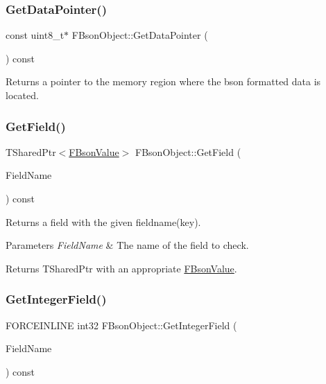 \subsubsection{\texorpdfstring{Get\+Data\+Pointer()}{GetDataPointer()}}
{\footnotesize\ttfamily const uint8\+\_\+t$\ast$ F\+Bson\+Object\+::\+Get\+Data\+Pointer (\begin{DoxyParamCaption}{ }\end{DoxyParamCaption}) const}

\begin{DoxyReturn}{Returns}
a pointer to the memory region where the bson formatted data is located. 
\end{DoxyReturn}
\mbox{\label{class_f_bson_object_a8f5c19b16e114fb51789313da65ee438}} 
\subsubsection{\texorpdfstring{Get\+Field()}{GetField()}}
{\footnotesize\ttfamily T\+Shared\+Ptr$<$\mbox{\hyperlink{class_f_bson_value}{F\+Bson\+Value}}$>$ F\+Bson\+Object\+::\+Get\+Field (\begin{DoxyParamCaption}\item[{const F\+String \&}]{Field\+Name }\end{DoxyParamCaption}) const}

Returns a field with the given fieldname(key).


\begin{DoxyParams}{Parameters}
{\em Field\+Name} & The name of the field to check. \\
\hline
\end{DoxyParams}
\begin{DoxyReturn}{Returns}
T\+Shared\+Ptr with an appropriate \mbox{\hyperlink{class_f_bson_value}{F\+Bson\+Value}}. 
\end{DoxyReturn}
\mbox{\label{class_f_bson_object_a9560d742bc657aeb7439de7b5b378bc2}} 
\subsubsection{\texorpdfstring{Get\+Integer\+Field()}{GetIntegerField()}}
{\footnotesize\ttfamily F\+O\+R\+C\+E\+I\+N\+L\+I\+NE int32 F\+Bson\+Object\+::\+Get\+Integer\+Field (\begin{DoxyParamCaption}\item[{const F\+String \&}]{Field\+Name }\end{DoxyParamCaption}) const\hspace{0.3cm}{\ttfamily [inline]}}

